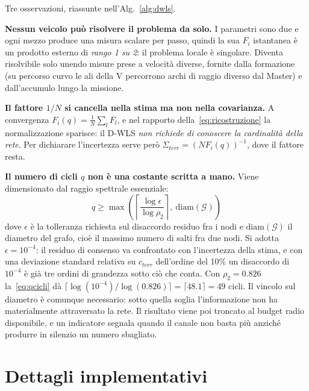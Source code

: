 \documentclass[conference,9pt]{IEEEtran}
\begin{document}
Tre osservazioni, riassunte nell'Alg.~\ref{alg:dwls}.

\textbf{Nessun veicolo pu\`o risolvere il problema da solo.} I parametri sono
due e ogni mezzo produce una misura scalare per passo, quindi la sua $F_i$
istantanea \`e un prodotto esterno di \emph{rango 1 su 2}: il problema locale
\`e singolare. Diventa risolvibile solo unendo misure prese a velocit\`a
diverse, fornite dalla formazione (su percorso curvo le ali della V percorrono
archi di raggio diverso dal Master) e dall'accumulo lungo la missione.

\textbf{Il fattore $1/N$ si cancella nella stima ma non nella covarianza.} A
convergenza $F_i(q) = \frac{1}{N}\sum_l F_l$, e nel rapporto
della~\eqref{eq:ricostruzione} la normalizzazione sparisce: il D-WLS \emph{non
richiede di conoscere la cardinalit\`a della rete}. Per dichiarare l'incertezza
serve per\`o $\Sigma_{terr} = (N F_i(q))^{-1}$, dove il fattore resta.

\textbf{Il numero di cicli $q$ non \`e una costante scritta a mano.} Viene
dimensionato dal raggio spettrale essenziale:
\begin{equation}
q \geq \max\left(\left\lceil \frac{\log \epsilon}{\log \rho_2} \right\rceil,\
\mathrm{diam}(\mathcal{G})\right)
\label{eq:qcicli}
\end{equation}
dove $\epsilon$ \`e la tolleranza richiesta sul disaccordo residuo fra i nodi e
$\mathrm{diam}(\mathcal{G})$ il diametro del grafo, cio\`e il massimo numero di
salti fra due nodi. Si adotta $\epsilon = 10^{-4}$: il residuo di consenso va
confrontato con l'incertezza della stima, e con una deviazione standard relativa
su $c_{terr}$ dell'ordine del 10\% un disaccordo di $10^{-4}$ \`e gi\`a tre
ordini di grandezza sotto ci\`o che conta. Con $\rho_2 = 0.826$
la~\eqref{eq:qcicli} d\`a
$\lceil \log(10^{-4})/\log(0.826)\rceil = \lceil 48.1 \rceil = 49$ cicli.
Il vincolo sul diametro \`e comunque necessario: sotto quella soglia
l'informazione non ha materialmente attraversato la rete. Il risultato viene poi
troncato al budget radio disponibile, e un indicatore segnala quando il canale
non basta pi\`u anzich\'e produrre in silenzio un numero sbagliato.

\section{Dettagli implementativi}
\label{sec:implementazione}
\end{document}
